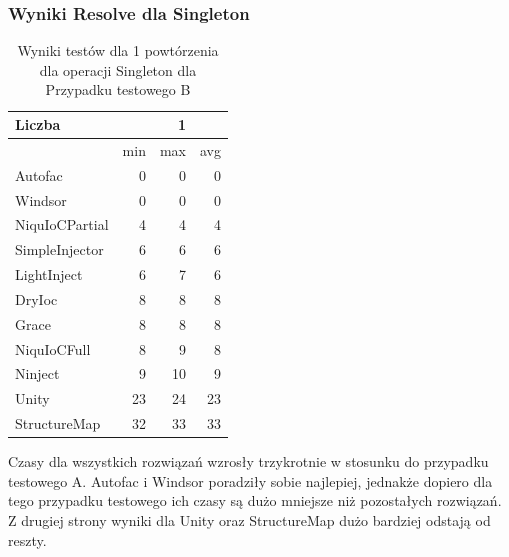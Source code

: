 \documentclass[12pt]{article}
\begin{document}
\subsubsection{Wyniki Resolve dla Singleton}
\begin{table}[H]
\captionsetup{belowskip=0pt,aboveskip=0pt}
\begin{center}
\begin{small}
	\begin{tabular}{ | l | r r r | }
    		\hline
Liczba & & 1 & \\ \hline
 & min & max & avg \\ \hline
Autofac & 0 & 0 & 0 \\ \hline
Windsor & 0 & 0 & 0 \\ \hline
NiquIoCPartial & 4 & 4 & 4 \\ \hline
SimpleInjector & 6 & 6 & 6 \\ \hline
LightInject & 6 & 7 & 6 \\ \hline
DryIoc & 8 & 8 & 8 \\ \hline
Grace & 8 & 8 & 8 \\ \hline
NiquIoCFull & 8 & 9 & 8 \\ \hline
Ninject & 9 & 10 & 9 \\ \hline
Unity & 23 & 24 & 23 \\ \hline
StructureMap & 32 & 33 & 33 \\ \hline
  	\end{tabular}
\end{small}
\end{center}
\caption{Wyniki testów dla 1 powtórzenia dla operacji Singleton dla Przypadku testowego B}
\label{TestCaseB_Singleton1}
\end{table}
Czasy dla wszystkich rozwiązań wzrosły trzykrotnie w stosunku do przypadku testowego A. Autofac i Windsor poradziły sobie najlepiej, jednakże dopiero dla tego przypadku testowego ich czasy są dużo mniejsze niż pozostałych rozwiązań. Z drugiej strony wyniki dla Unity oraz StructureMap dużo bardziej odstają od reszty.
\\ \\
\end{document}
